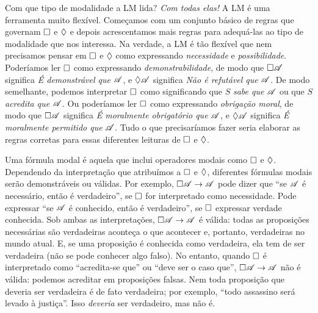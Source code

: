Com que tipo de modalidade a LM lida? \emph{Com todas elas!} A LM é uma ferramenta muito flexível. Começamos com um conjunto básico de regras que governam $\Box$ e $\Diamond$ e depois acrescentamos mais regras para adequá-las ao tipo de modalidade que nos interessa. Na verdade, a LM é tão flexível que nem precisamos pensar em $\Box$ e $\Diamond$ como expressando \emph{necessidade} e \emph{possibilidade}. Poderíamos ler $\Box$ como expressando \emph{demonstrabilidade}, de modo que $\Box\mathscr{A}$ significa \emph{É demonstrável que} $\mathscr{A}$, e $\Diamond\mathscr{A}$ significa \emph{Não é refutável que} $\mathscr{A}$. De modo semelhante, podemos interpretar $\Box$ como significando que $S$ \emph{sabe que $\mathscr{A}$} ou que $S$ \emph{acredita que $\mathscr{A}$}. Ou poderíamos ler $\Box$ como expressando \emph{obrigação moral}, de modo que $\Box \mathscr{A}$ significa \emph{É moralmente obrigatório que} $\mathscr{A}$, e $\Diamond \mathscr{A}$ significa \emph{É moralmente permitido que} $\mathscr{A}$. Tudo o que precisaríamos fazer seria elaborar as regras corretas para essas diferentes leituras de $\Box$ e $\Diamond$.

Uma fórmula modal é aquela que inclui operadores modais como $\Box$ e $\Diamond$. Dependendo da interpretação que atribuímos a $\Box$ e $\Diamond$, diferentes fórmulas modais serão demonstráveis ou válidas. Por exemplo, $\Box \mathscr{A} \rightarrow \mathscr{A}$ pode dizer que \textquotedblleft se $\mathscr{A}$ é necessário, então é verdadeiro\textquotedblright{}, se $\Box$ for interpretado como necessidade. Pode expressar \textquotedblleft se $\mathscr{A}$ é conhecido, então é verdadeiro\textquotedblright{}, se $\Box$ expressar verdade conhecida. Sob ambas as interpretações, $\Box\mathscr{A} \rightarrow \mathscr{A}$ é válida: todas as proposições necessárias são verdadeiras aconteça o que acontecer e, portanto, verdadeiras no mundo atual. E, se uma proposição é conhecida como verdadeira, ela tem de ser verdadeira (não se pode conhecer algo falso). No entanto, quando $\Box$ é interpretado como \textquotedblleft acredita-se que\textquotedblright{} ou \textquotedblleft deve ser o caso que\textquotedblright{}, $\Box\mathscr{A} \rightarrow \mathscr{A}$ não é válida: podemos acreditar em proposições falsas. Nem toda proposição que deveria ser verdadeira é de fato verdadeira; por exemplo, \textquotedblleft todo assassino será levado à justiça\textquotedblright{}. Isso \emph{deveria} ser verdadeiro, mas não é.

